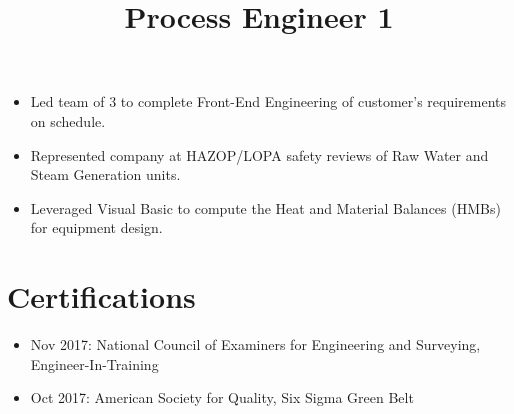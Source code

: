 \documentclass[12pt]{res} %
\begin{document}
\begin{resume}
        \title{\textbf{Process Engineer 1}}
        \begin{position}
          \vspace{-14pt}
          \begin{itemize}[leftmargin=-0.4cm]
              \itemsep0em 
              \item Led team of 3 to complete Front-End Engineering of customer's requirements on schedule.	
              \item Represented company at HAZOP/LOPA safety reviews of Raw Water and Steam Generation units.
              \item Leveraged Visual Basic to compute the Heat and Material Balances (HMBs) for equipment design.				
          \end{itemize}
        \end{position}
        \vspace{-12pt}

      \section{Certifications} 
        \begin{itemize}[leftmargin=-0.4cm]
        \itemsep0em
        \item Nov 2017: National Council of Examiners for Engineering and Surveying, Engineer-In-Training
        \item Oct 2017: American Society for Quality, Six Sigma Green Belt
        \end{itemize}
        \vspace{-12pt}

    \end{resume}

\vspace*{\fill}
\end{document}
